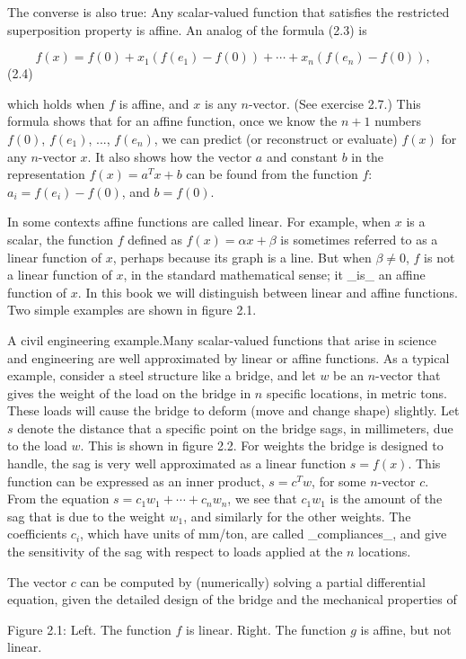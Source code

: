 The converse is also true: Any scalar-valued function that satisfies the restricted superposition property is affine. An analog of the formula (2.3) is

\[f(x)=f(0)+x_{1}\left(f(e_{1})-f(0)\right)+\cdots+x_{n}\left(f(e_{n})-f(0)\right),\] (2.4)

which holds when \(f\) is affine, and \(x\) is any \(n\)-vector. (See exercise 2.7.) This formula shows that for an affine function, once we know the \(n+1\) numbers \(f(0)\), \(f(e_{1})\), ..., \(f(e_{n})\), we can predict (or reconstruct or evaluate) \(f(x)\) for any \(n\)-vector \(x\). It also shows how the vector \(a\) and constant \(b\) in the representation \(f(x)=a^{T}x+b\) can be found from the function \(f\): \(a_{i}=f(e_{i})-f(0)\), and \(b=f(0)\).

In some contexts affine functions are called linear. For example, when \(x\) is a scalar, the function \(f\) defined as \(f(x)=\alpha x+\beta\) is sometimes referred to as a linear function of \(x\), perhaps because its graph is a line. But when \(\beta\neq 0\), \(f\) is not a linear function of \(x\), in the standard mathematical sense; it _is_ an affine function of \(x\). In this book we will distinguish between linear and affine functions. Two simple examples are shown in figure 2.1.

A civil engineering example.Many scalar-valued functions that arise in science and engineering are well approximated by linear or affine functions. As a typical example, consider a steel structure like a bridge, and let \(w\) be an \(n\)-vector that gives the weight of the load on the bridge in \(n\) specific locations, in metric tons. These loads will cause the bridge to deform (move and change shape) slightly. Let \(s\) denote the distance that a specific point on the bridge sags, in millimeters, due to the load \(w\). This is shown in figure 2.2. For weights the bridge is designed to handle, the sag is very well approximated as a linear function \(s=f(x)\). This function can be expressed as an inner product, \(s=c^{T}w\), for some \(n\)-vector \(c\). From the equation \(s=c_{1}w_{1}+\cdots+c_{n}w_{n}\), we see that \(c_{1}w_{1}\) is the amount of the sag that is due to the weight \(w_{1}\), and similarly for the other weights. The coefficients \(c_{i}\), which have units of mm/ton, are called _compliances_, and give the sensitivity of the sag with respect to loads applied at the \(n\) locations.

The vector \(c\) can be computed by (numerically) solving a partial differential equation, given the detailed design of the bridge and the mechanical properties of

Figure 2.1: Left. The function \(f\) is linear. Right. The function \(g\) is affine, but not linear.

 